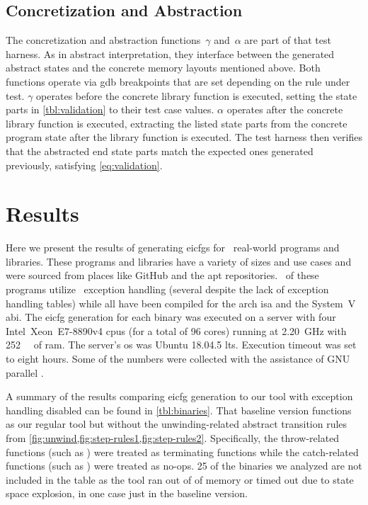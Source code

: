 \subsection{Concretization and Abstraction}
The concretization and abstraction functions~$\gamma$ and~$\alpha$ are part of that test harness.
As in abstract interpretation, they interface between the generated abstract states and the concrete memory layouts mentioned above.
Both functions operate via \ac{gdb} breakpoints that are set depending on the rule under test.
$\gamma$ operates before the concrete library function is executed, setting the state parts in \cref{tbl:validation} to their test case values.
$\alpha$ operates after the concrete library function is executed, extracting the listed state parts from the concrete program state after the library function is executed.
The test harness then verifies that the abstracted end state parts match the expected ones generated previously, satisfying \cref{eq:validation}.

\section{Results}\label{eicfg-results}
Here we present the results of generating \acp{eicfg} for \totalbins\ real-world programs and libraries.
These programs and libraries have a variety of sizes and use cases and were sourced from places like GitHub and the \ac{apt} repositories.
\exceptbins\ of these programs utilize \Cpp\ exception handling (several despite the lack of exception handling tables) while all have been compiled for the \gls{arch} \ac{isa} and the System~V \ac{abi}.
The \ac{eicfg} generation for each binary was executed on a server with four Intel\textregistered\ Xeon\textregistered\ E7-8890v4 \acp{cpu} (for a total of 96 cores) running at \SI{2.20}{\giga\hertz} with \SI{252}{\gibi\byte} of \ac{ram}.
The server's \ac{os} was Ubuntu 18.04.5 \ac{lts}.
Execution timeout was set to eight hours. %
Some of the numbers were collected with the assistance of GNU parallel \autocite{Tange2011a}.

A summary of the results comparing \ac{eicfg} generation to our tool with exception handling disabled can be found in \cref{tbl:binaries}.
That baseline version functions as our regular tool but without the unwinding-related abstract transition rules from \cref{fig:unwind,fig:step-rules1,fig:step-rules2}. Specifically, the throw-related functions (such as ) were treated as terminating functions while the catch-related functions (such as ) were treated as no-ops.
25 of the binaries we analyzed are not included in the table as the tool ran out of of memory or timed out due to state space explosion, in one case just in the baseline version.

